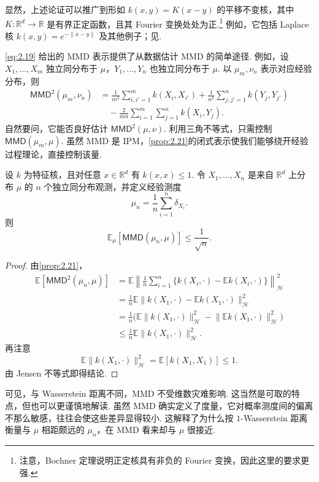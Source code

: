 显然，上述论证可以推广到形如 $k(x,y)=K(x-y)$ 的平移不变核，其中 $K:\mathbb R^d\to\mathbb R$ 是有界正定函数，且其 Fourier 变换处处为正.\footnote{注意，Bochner 定理说明正定核具有非负的 Fourier 变换，因此这里的要求更强.} 例如，它包括 Laplace 核 $k(x,y)=e^{-\lVert x-y\rVert}$ 及其他例子；见\cite[表3.1]{ref232}.

\eqref{eq:2.19} 给出的 MMD 表示提供了从数据估计 MMD 的简单途径. 例如，设 $X_1,\ldots,X_m$ 独立同分布于 $\mu$，$Y_1,\ldots,Y_n$ 也独立同分布于 $\mu$. 以 $\mu_m,\nu_n$ 表示对应经验分布，则
$$\begin{aligned}
\mathsf{MMD}^2(\mu_m,\nu_n)
&=\frac1{m^2}\sum_{i,i'=1}^m k(X_i,X_{i'})+\frac1{n^2}\sum_{j,j'=1}^n k(Y_j,Y_{j'})\\
&\quad-\frac2{mn}\sum_{i=1}^m\sum_{j=1}^n k(X_i,Y_j).
\end{aligned}$$
自然要问，它能否良好估计 $\mathsf{MMD}^2(\mu,\nu)$. 利用三角不等式，只需控制 $\mathsf{MMD}(\mu_m,\mu)$. 虽然 MMD 是 IPM，\autoref{prop:2.21}的闭式表示使我们能够绕开经验过程理论，直接控制该量.
\begin{theorem}\label{thm:2.22}
设 $k$ 为特征核，且对任意 $x\in\mathbb R^d$ 有 $k(x,x)\le1$. 令 $X_1,\ldots,X_n$ 是来自 $\mathbb R^d$ 上分布 $\mu$ 的 $n$ 个独立同分布观测，并定义经验测度
$$\mu_n=\frac1n\sum_{i=1}^n\delta_{X_i}.$$
则
$$\mathbb E_\mu[\mathsf{MMD}(\mu_n,\mu)]\le\frac1{\sqrt n}.$$
\end{theorem}
\begin{proof}
由\autoref{prop:2.21}，
$$\begin{aligned}
\mathbb E[\mathsf{MMD}^2(\mu_n,\mu)]
&=\mathbb E\left\lVert\frac1n\sum_{i=1}^n\{k(X_i,\cdot)-\mathbb Ek(X_i,\cdot)\}\right\rVert_{\mathcal H}^2\\
&=\frac1n\mathbb E\lVert k(X_1,\cdot)-\mathbb Ek(X_1,\cdot)\rVert_{\mathcal H}^2\\
&=\frac1n\bigl(\mathbb E\lVert k(X_1,\cdot)\rVert_{\mathcal H}^2-\lVert\mathbb Ek(X_1,\cdot)\rVert_{\mathcal H}^2\bigr)\\
&\le\frac1n\mathbb E\lVert k(X_1,\cdot)\rVert_{\mathcal H}^2.
\end{aligned}$$
再注意
$$\mathbb E\lVert k(X_1,\cdot)\rVert_{\mathcal H}^2=\mathbb E[k(X_1,X_1)]\le1.$$
由 Jensen 不等式即得结论.
\end{proof}
可见，与 Wasserstein 距离不同，MMD 不受维数灾难影响. 这当然是可取的特点，但也可以更谨慎地解读. 虽然 MMD 确实定义了度量，它对概率测度间的偏离不那么敏感，往往会使这些差异显得较小. 这解释了为什么按 $1$-Wasserstein 距离衡量与 $\mu$ 相距颇远的 $\mu_n$，在 MMD 看来却与 $\mu$ 很接近.

